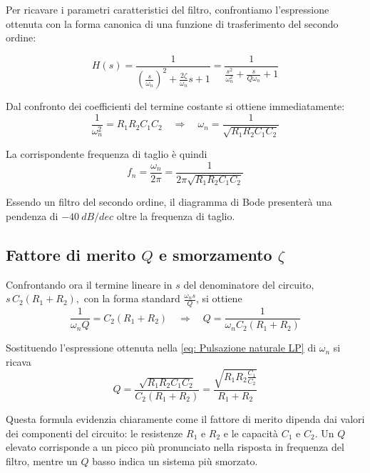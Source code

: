 Per ricavare i parametri caratteristici del filtro, confrontiamo l'espressione ottenuta con la forma canonica di una funzione di trasferimento del secondo ordine:

\begin{equation}
    H(s) = \frac{1}{\left(\frac{s}{\omega_n}\right)^2 + \frac{2\zeta}{\omega_n}s + 1} = \frac{1}{\frac{s^2}{\omega_n^2} + \frac{s}{Q\omega_n} + 1}
    \label{eq: FdT norm LP}
\end{equation}

Dal confronto dei coefficienti del termine costante si ottiene immediatamente:
\begin{equation}
    \frac{1}{\omega_n^2} = R_1 R_2 C_1 C_2 \quad \Rightarrow \quad 
    \omega_n = \frac{1}{\sqrt{R_1 R_2 C_1 C_2}}
    \label{eq: Pulsazione naturale LP}
\end{equation}

La corrispondente frequenza di taglio è quindi
\begin{equation}
    f_n = \frac{\omega_n}{2\pi} = \frac{1}{2\pi \sqrt{R_1 R_2 C_1 C_2}}
    \label{eq: Frequenza naturale LP}
\end{equation}

Essendo un filtro del secondo ordine, il diagramma di Bode presenterà una pendenza di $\SI{-40}{dB/dec}$ oltre la frequenza di taglio.

\subsection{Fattore di merito \texorpdfstring{$Q$}{Q} e smorzamento \texorpdfstring{$\zeta$}{ζ}}

Confrontando ora il termine lineare in $s$ del denominatore del circuito,
\(
s\,C_2(R_1 + R_2),
\)
con la forma standard $\frac{\omega_n s}{Q}$, si ottiene
\begin{equation}
    \frac{1}{\omega_n Q} = C_2(R_1 + R_2) \quad \Rightarrow \quad 
    Q = \frac{1}{\omega_n C_2(R_1 + R_2)}
    \label{eq: Fattore di merito LP}
\end{equation}

Sostituendo l'espressione ottenuta nella \ref{eq: Pulsazione naturale LP} di $\omega_n$ si ricava
\begin{equation}
    Q = \frac{\sqrt{R_1 R_2 C_1 C_2}}{C_2 (R_1 + R_2)}
      = \frac{\sqrt{R_1 R_2 \frac{C_1}{C_2}}}{R_1 + R_2}
      \label{eq: Fattore di merito RC LP}
\end{equation}

Questa formula evidenzia chiaramente come il fattore di merito dipenda dai valori dei componenti del circuito: le resistenze $R_1$ e $R_2$ e le capacità $C_1$ e $C_2$. Un $Q$ elevato corrisponde a un picco più pronunciato nella risposta in frequenza del filtro, mentre un $Q$ basso indica un sistema più smorzato.

